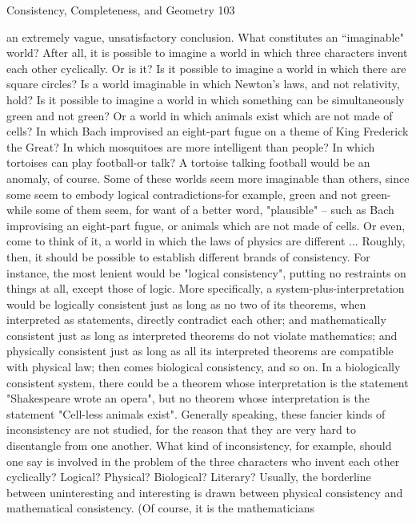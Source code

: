 Consistency, Completeness, and Geometry                                                   103

an extremely vague, unsatisfactory conclusion. What constitutes an “imaginable" world?
After all, it is possible to imagine a world in which three characters invent each other
cyclically. Or is it? Is it possible to imagine a world in which there are square circles? Is a
world imaginable in which Newton's laws, and not relativity, hold? Is it possible to
imagine a world in which something can be simultaneously green and not green? Or a
world in which animals exist which are not made of cells? In which Bach improvised an
eight-part fugue on a theme of King Frederick the Great? In which mosquitoes are more
intelligent than people? In which tortoises can play football-or talk? A tortoise talking
football would be an anomaly, of course.
        Some of these worlds seem more imaginable than others, since some seem to
embody logical contradictions-for example, green and not green-while some of them
seem, for want of a better word, "plausible" -- such as Bach improvising an eight-part
fugue, or animals which are not made of cells. Or even, come to think of it, a world in
which the laws of physics are different ... Roughly, then, it should be possible to establish
different brands of consistency. For instance, the most lenient would be "logical
consistency", putting no restraints on things at all, except those of logic. More
specifically, a system-plus-interpretation would be logically consistent just as long as no
two of its theorems, when interpreted as statements, directly contradict each other; and
mathematically consistent just as long as interpreted theorems do not violate
mathematics; and physically consistent just as long as all its interpreted theorems are
compatible with physical law; then comes biological consistency, and so on. In a
biologically consistent system, there could be a theorem whose interpretation is the
statement "Shakespeare wrote an opera", but no theorem whose interpretation is the
statement "Cell-less animals exist". Generally speaking, these fancier kinds of
inconsistency are not studied, for the reason that they are very hard to disentangle from
one another. What kind of inconsistency, for example, should one say is involved in the
problem of the three characters who invent each other cyclically? Logical? Physical?
Biological? Literary?
        Usually, the borderline between uninteresting and interesting is drawn between
physical consistency and mathematical consistency. (Of course, it is the mathematicians
